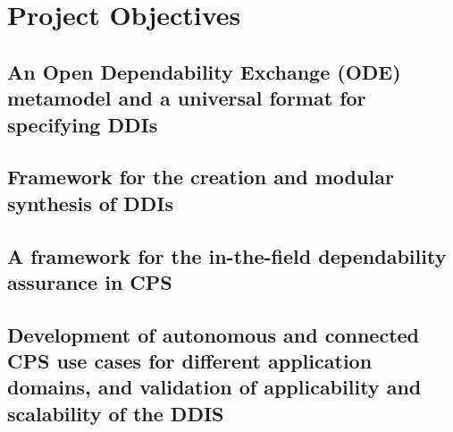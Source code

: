 \section{Project Objectives}

\subsection{An Open Dependability Exchange (ODE) metamodel and a universal format for specifying DDIs}


\subsection{Framework for the creation and modular synthesis of DDIs}

\subsection{A framework for the in-the-field dependability assurance in CPS}

\subsection{Development of autonomous and connected CPS use cases for different application domains, and validation of applicability and scalability of the DDIS}